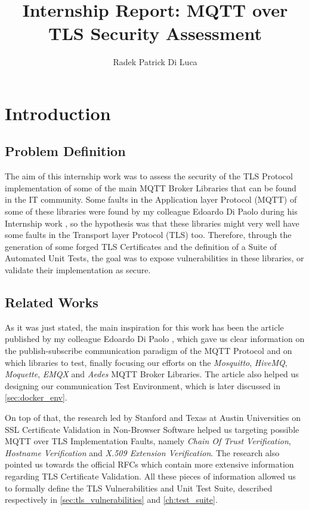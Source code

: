 \documentclass[binding=0.6cm,noexaminfo]{sapthesis}
\title{Internship Report: MQTT over TLS Security Assessment} \author{Radek Patrick Di Luca}
\begin{document}
\frontmatter
\maketitle
\tableofcontents
\mainmatter
\chapter{Introduction}
\section{Problem Definition}
The aim of this internship work was to assess the security of the TLS Protocol implementation of some of the main MQTT Broker Libraries that can be found in the IT community. Some faults in the Application layer Protocol (MQTT) of some of these libraries were found by my colleague Edoardo Di Paolo during his Internship work \cite{mqttpaper}, so the hypothesis was that these libraries might very well have some faults in the Transport layer Protocol (TLS) too.
Therefore, through the generation of some forged TLS Certificates and the definition of a Suite of Automated Unit Tests, the goal was to expose vulnerabilities in these libraries, or validate their implementation as secure.

\section{Related Works}
As it was just stated, the main inspiration for this work has been the article published by my colleague Edoardo Di Paolo \cite{mqttpaper}, which gave us clear information on the publish-subscribe communication paradigm of the MQTT Protocol and on which libraries to test, finally focusing our efforts on the \textit{Mosquitto}, \textit{HiveMQ}, \textit{Moquette}, \textit{EMQX} and \textit{Aedes} MQTT Broker Libraries. The article \cite{mqttpaper} also helped us designing our communication Test Environment, which is later discussed in \autoref{sec:docker_env}.

On top of that, the research led by Stanford and Texas at Austin Universities on SSL Certificate Validation in Non-Browser Software \cite{sslvalidation} helped us targeting possible MQTT over TLS Implementation Faults, namely \textit{Chain Of Trust Verification}, \textit{Hostname Verification} and \textit{X.509 Extension Verification}. The research \cite{sslvalidation} also pointed us towards the official RFCs \cites{rfc2818}{rfc5280}{rfc8446} which contain more extensive information regarding TLS Certificate Validation. All these pieces of information allowed us to formally define the TLS Vulnerabilities and Unit Test Suite, described respectively in \autoref{sec:tls_vulnerabilities} and \autoref{ch:test_suite}.
\end{document}
